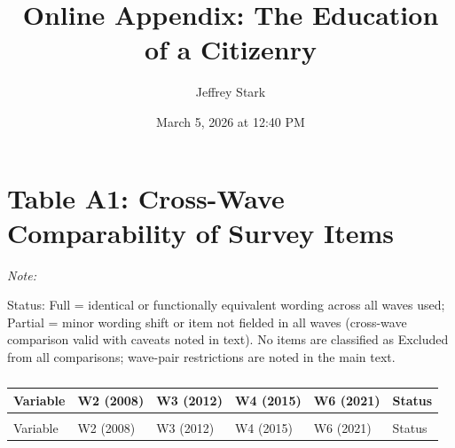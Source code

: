 \documentclass[
  12pt,
  letterpaper]{article}
\title{Online Appendix: The Education of a Citizenry}
\author{Jeffrey Stark}
\date{March 5, 2026 at 12:40 PM}
\begin{document}
\maketitle


\section*{Table A1: Cross-Wave Comparability of Survey
Items}\label{table-a1-cross-wave-comparability-of-survey-items}

\begingroup\fontsize{7}{9}\selectfont

\begin{ThreePartTable}
\begin{TableNotes}[para]
\item \textit{Note:} 
\item Status: Full = identical or functionally equivalent wording across all waves used; Partial = minor wording shift or item not fielded in all waves (cross-wave comparison valid with caveats noted in text). No items are classified as Excluded from all comparisons; wave-pair restrictions are noted in the main text.
\end{TableNotes}

\begin{longtable}[t]{>{\raggedright\arraybackslash}p{2.0cm}>{\raggedright\arraybackslash}p{2.3cm}>{\raggedright\arraybackslash}p{2.3cm}>{\raggedright\arraybackslash}p{2.3cm}>{\raggedright\arraybackslash}p{2.3cm}>{\raggedright\arraybackslash}p{1.5cm}}

\caption{\label{tbl-tableA1}}

\tabularnewline

\toprule
Variable & W2 (2008) & W3 (2012) & W4 (2015) & W6 (2021) & Status\\
\midrule
\endfirsthead
\multicolumn{6}{@{}l}{\textit{(continued)}}\\
\toprule
Variable & W2 (2008) & W3 (2012) & W4 (2015) & W6 (2021) & Status\\
\midrule
\endhead


\end{longtable}
\end{ThreePartTable}
\end{document}

